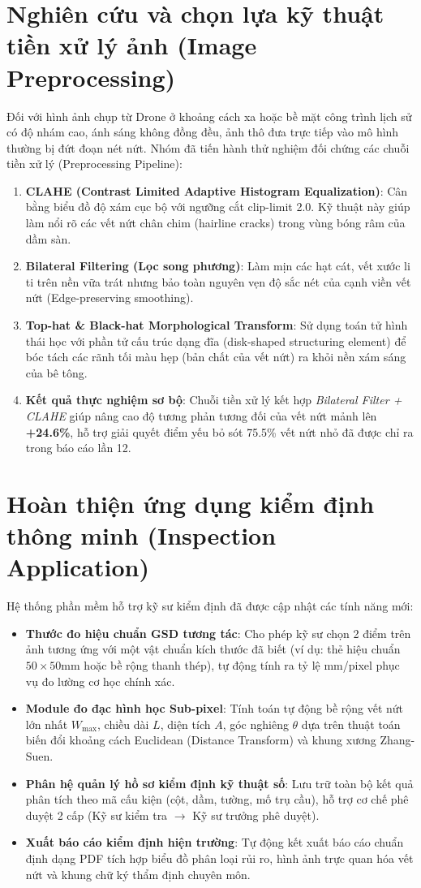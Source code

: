 \documentclass[12pt,a4paper]{article}
\begin{document}
\section{Nghiên cứu và chọn lựa kỹ thuật tiền xử lý ảnh (Image Preprocessing)}
Đối với hình ảnh chụp từ Drone ở khoảng cách xa hoặc bề mặt công trình lịch sử có độ nhám cao, ánh sáng không đồng đều, ảnh thô đưa trực tiếp vào mô hình thường bị đứt đoạn nét nứt. Nhóm đã tiến hành thử nghiệm đối chứng các chuỗi tiền xử lý (Preprocessing Pipeline):
\begin{enumerate}[leftmargin=*]
    \item \textbf{CLAHE (Contrast Limited Adaptive Histogram Equalization)}: Cân bằng biểu đồ độ xám cục bộ với ngưỡng cắt clip-limit 2.0. Kỹ thuật này giúp làm nổi rõ các vết nứt chân chim (hairline cracks) trong vùng bóng râm của dầm sàn.
    \item \textbf{Bilateral Filtering (Lọc song phương)}: Làm mịn các hạt cát, vết xước li ti trên nền vữa trát nhưng bảo toàn nguyên vẹn độ sắc nét của cạnh viền vết nứt (Edge-preserving smoothing).
    \item \textbf{Top-hat \& Black-hat Morphological Transform}: Sử dụng toán tử hình thái học với phần tử cấu trúc dạng đĩa (disk-shaped structuring element) để bóc tách các rãnh tối màu hẹp (bản chất của vết nứt) ra khỏi nền xám sáng của bê tông.
    \item \textbf{Kết quả thực nghiệm sơ bộ}: Chuỗi tiền xử lý kết hợp \emph{Bilateral Filter + CLAHE} giúp nâng cao độ tương phản tương đối của vết nứt mảnh lên \textbf{+24.6\%}, hỗ trợ giải quyết điểm yếu bỏ sót 75.5\% vết nứt nhỏ đã được chỉ ra trong báo cáo lần 12.
\end{enumerate}

\section{Hoàn thiện ứng dụng kiểm định thông minh (Inspection Application)}
Hệ thống phần mềm hỗ trợ kỹ sư kiểm định đã được cập nhật các tính năng mới:
\begin{itemize}[leftmargin=*]
    \item \textbf{Thước đo hiệu chuẩn GSD tương tác}: Cho phép kỹ sư chọn 2 điểm trên ảnh tương ứng với một vật chuẩn kích thước đã biết (ví dụ: thẻ hiệu chuẩn $50\times50$mm hoặc bề rộng thanh thép), tự động tính ra tỷ lệ mm/pixel phục vụ đo lường cơ học chính xác.
    \item \textbf{Module đo đạc hình học Sub-pixel}: Tính toán tự động bề rộng vết nứt lớn nhất $W_{\max}$, chiều dài $L$, diện tích $A$, góc nghiêng $\theta$ dựa trên thuật toán biến đổi khoảng cách Euclidean (Distance Transform) và khung xương Zhang-Suen.
    \item \textbf{Phân hệ quản lý hồ sơ kiểm định kỹ thuật số}: Lưu trữ toàn bộ kết quả phân tích theo mã cấu kiện (cột, dầm, tường, mố trụ cầu), hỗ trợ cơ chế phê duyệt 2 cấp (Kỹ sư kiểm tra $\rightarrow$ Kỹ sư trưởng phê duyệt).
    \item \textbf{Xuất báo cáo kiểm định hiện trường}: Tự động kết xuất báo cáo chuẩn định dạng PDF tích hợp biểu đồ phân loại rủi ro, hình ảnh trực quan hóa vết nứt và khung chữ ký thẩm định chuyên môn.
\end{itemize}
\end{document}

